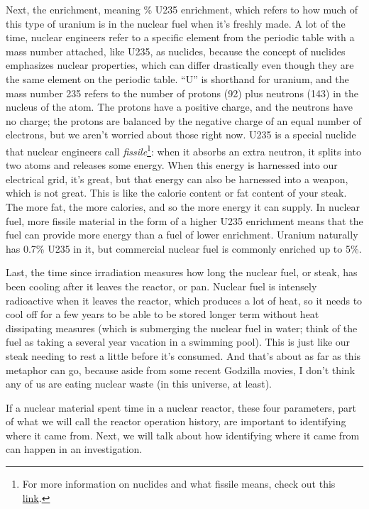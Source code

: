 {Next, the enrichment, meaning \% \gls{U235} enrichment, which refers to how
much of this type of uranium is in the nuclear fuel when it's freshly made.  A
lot of the time, nuclear engineers refer to a specific element from the
periodic table with a mass number attached, like \gls{U235}, as nuclides,
because the concept of nuclides emphasizes nuclear properties, which can differ
drastically even though they are the same element on the periodic table. ``U'' is
shorthand for uranium, and the mass number 235 refers to the number of protons
(92) plus neutrons (143) in the nucleus of the atom. The protons have a
positive charge, and the neutrons have no charge; the protons are balanced by
the negative charge of an equal number of electrons, but we aren't worried
about those right now. \gls{U235} is a special nuclide that nuclear engineers
call \textit{fissile}\footnote{For more information on nuclides and what
fissile means, check out this
\href{https://whatisnuclear.com/isotopes.html}{\color{violet}link}.}: when it
absorbs an extra neutron, it splits into two atoms and releases some energy.
When this energy is harnessed into our electrical grid, it's great, but that
energy can also be harnessed into a weapon, which is not great. This is like
the calorie content or fat content of your steak. The more fat, the more
calories, and so the more energy it can supply. In nuclear fuel, more fissile
material in the form of a higher \gls{U235} enrichment means that the fuel can
provide more energy than a fuel of lower enrichment. Uranium naturally has
0.7\% \gls{U235} in it, but commercial nuclear fuel is commonly enriched up to
5\%.

Last, the time since irradiation measures how long the nuclear fuel, or steak,
has been cooling after it leaves the reactor, or pan. Nuclear fuel is intensely
radioactive when it leaves the reactor, which produces a lot of heat, so it
needs to cool off for a few years to be able to be stored longer term without
heat dissipating measures (which is submerging the nuclear fuel in water; think
of the fuel as taking a several year vacation in a swimming pool). This is just
like our steak needing to rest a little before it's consumed. And that's about
as far as this metaphor can go, because aside from some recent Godzilla movies,
I don't think any of us are eating nuclear waste (in this universe, at least). 

If a nuclear material spent time in a nuclear reactor, these four parameters,
part of what we will call the reactor operation history, are important to
identifying where it came from. Next, we will talk about how identifying
where it came from can happen in an investigation.

}
